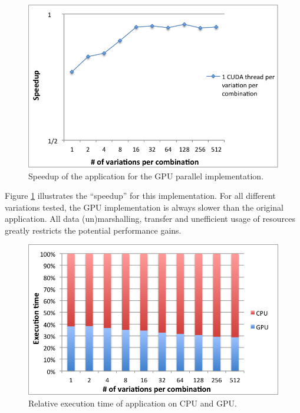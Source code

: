 \begin{figure}[!htp]
	\begin{center}
		\includegraphics[scale=0.7]{../../common/graphs/speedup_gpu.png}
		\caption{Speedup of the \tth application for the GPU parallel implementation.}
		\label{fig:GPUSpeedup}
	\end{center}
\end{figure}

Figure \ref{fig:GPUSpeedup} illustrates the ``speedup'' for this implementation. For all different variations tested, the GPU implementation is always slower than the original application. All data (un)marshalling, transfer and unefficient usage of resources greatly restricts the potential performance gains.

\begin{figure}[!htp]
	\begin{center}
		\includegraphics[scale=0.7]{../../common/graphs/percentage_time_gpu.png}
		\caption{Relative execution time of \tth application on CPU and GPU.}
		\label{fig:GPUPercentage}
	\end{center}
\end{figure}

